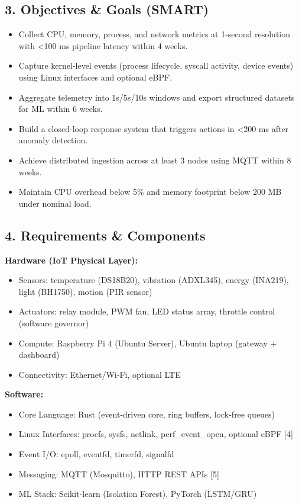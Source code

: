 \documentclass[11pt]{article}
\begin{document}
\subsection{3. Objectives \& Goals (SMART)}
\begin{itemize}
    \item Collect CPU, memory, process, and network metrics at 1-second resolution with \textless 100 ms pipeline latency within 4 weeks.
    \item Capture kernel-level events (process lifecycle, syscall activity, device events) using Linux interfaces and optional eBPF.
    \item Aggregate telemetry into 1s/5s/10s windows and export structured datasets for ML within 6 weeks.
    \item Build a closed-loop response system that triggers actions in \textless 200 ms after anomaly detection.
    \item Achieve distributed ingestion across at least 3 nodes using MQTT within 8 weeks.
    \item Maintain CPU overhead below 5\% and memory footprint below 200 MB under nominal load.
\end{itemize}

\subsection{4. Requirements \& Components}
\textbf{Hardware (IoT Physical Layer):}
\begin{itemize}
    \item Sensors: temperature (DS18B20), vibration (ADXL345), energy (INA219), light (BH1750), motion (PIR sensor)
    \item Actuators: relay module, PWM fan, LED status array, throttle control (software governor)
    \item Compute: Raspberry Pi 4 (Ubuntu Server), Ubuntu laptop (gateway + dashboard)
    \item Connectivity: Ethernet/Wi-Fi, optional LTE
\end{itemize}

\textbf{Software:}
\begin{itemize}
    \item Core Language: Rust (event-driven core, ring buffers, lock-free queues)
    \item Linux Interfaces: procfs, sysfs, netlink, perf\_event\_open, optional eBPF [4]
    \item Event I/O: epoll, eventfd, timerfd, signalfd
    \item Messaging: MQTT (Mosquitto), HTTP REST APIs [5]
    \item ML Stack: Scikit-learn (Isolation Forest), PyTorch (LSTM/GRU)
\end{itemize}
\end{document}

